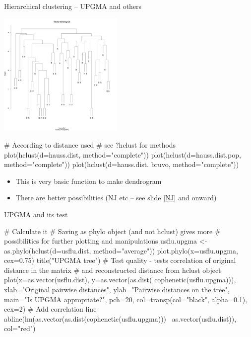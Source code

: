 \documentclass[compress, ucs, xelatex, 11pt, xcolor=svgnames,
  hyperref={
    bookmarks=true,
    unicode=true,
    colorlinks=true,
    pdftitle={Molecular data in R},
    plainpages=false,
    pdfauthor={Vojtech Zeisek},
    pdfsubject={Course about phylogeny and evolution in R},
    pdfcreator={XeLaTeX},
    pdfkeywords={R, evolution, phylogeny, molecular data},
    linkcolor=Tomato,
    anchorcolor=SaddleBrown,
    citecolor=Goldenrod,
    filecolor=DarkMagenta,
    menucolor=Sienna,
    urlcolor=DarkTurquoise,
    pdftex},
  url={hyphens, lowtilde} %
  ]{beamer}
\begin{document}
\begin{frame}[fragile]{Hierarchical clustering -- UPGMA and others}
\begin{multicols}{2}
  \includegraphics[height=6cm]{hierclust.png}
  \begin{spluscode}
    # According to distance used
    # see ?hclust for methods
    plot(hclust(d=hauss.dist,
      method="complete"))
    plot(hclust(d=hauss.dist.pop,
      method="complete"))
    plot(hclust(d=hauss.dist.
      bruvo, method="complete"))
  \end{spluscode}
  \vfil
  \begin{itemize}
    \item This is very basic function to make dendrogram
    \item There are better possibilities (NJ etc -- see slide \ref{NJ} and onward)
  \end{itemize}
\end{multicols}
\end{frame}

\begin{frame}[fragile]{UPGMA and its test}
  \begin{spluscode}
    # Calculate it
    # Saving as phylo object (and not hclust) gives more
    # possibilities for further plotting and manipulations
    usflu.upgma <- as.phylo(hclust(d=usflu.dist, method="average"))
    plot.phylo(x=usflu.upgma, cex=0.75)
    title("UPGMA tree")
    # Test quality - tests correlation of original distance in the matrix
    # and reconstructed distance from hclust object
    plot(x=as.vector(usflu.dist), y=as.vector(as.dist(
      cophenetic(usflu.upgma))), xlab="Original pairwise distances",
      ylab="Pairwise distances on the tree", main="Is UPGMA
      appropriate?", pch=20, col=transp(col="black",
      alpha=0.1), cex=2)
    # Add correlation line
    abline(lm(as.vector(as.dist(cophenetic(usflu.upgma)))~
      as.vector(usflu.dist)), col="red")
  \end{spluscode}
\end{frame}
\end{document}
